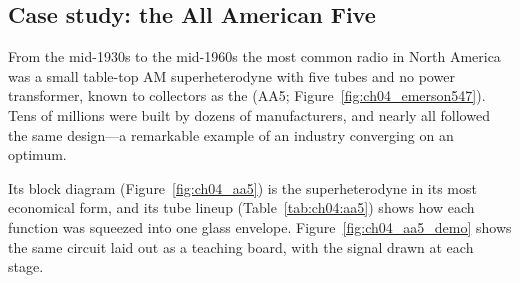 \subsection{Case study: the All American Five}
\label{sec:ch04:aa5}

From the mid-1930s to the mid-1960s the most common radio in North America was a small table-top AM
superheterodyne with five tubes and no power transformer, known to collectors as the 
(AA5; Figure~\ref{fig:ch04_emerson547}). Tens of millions were built by dozens of manufacturers, and nearly all
followed the same design---a remarkable example of an industry converging on an optimum.


Its block diagram (Figure~\ref{fig:ch04_aa5}) is the superheterodyne in its most economical form, and its tube
lineup (Table~\ref{tab:ch04:aa5}) shows how each function was squeezed into one glass envelope.
Figure~\ref{fig:ch04_aa5_demo} shows the same circuit laid out as a teaching board, with the signal drawn at
each stage.

